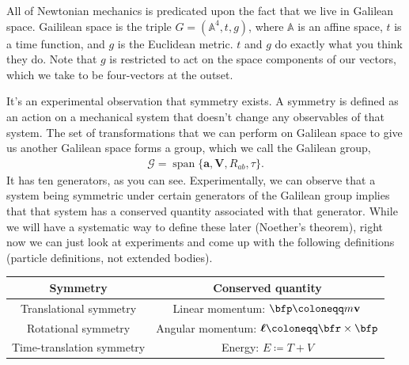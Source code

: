 \documentclass[11pt]{article}
\begin{document}



All of Newtonian mechanics is predicated upon the fact that we live
in Galilean space. Gaililean space is the triple $G = (\mathbb{A}^4, t, g)$,
where $\mathbb{A}$ is an affine space, $t$ is a time function, and $g$
is the Euclidean metric. $t$ and $g$ do exactly what you think they do.
Note that $g$ is restricted to act on the space components of our vectors,
which we take to be four-vectors at the outset.

It's an experimental observation that symmetry exists. A symmetry
is defined as an action on a mechanical system that doesn't change
any observables of that system. The set of transformations that
we can perform on Galilean space to give us another Galilean space
forms a group, which we call the Galilean group,
\begin{align*}
    \mathcal{G} = \operatorname{span}\{ \mathbf{a}, \mathbf{V}, R_{ab}, \tau \}.
\end{align*}
It has ten generators, as you can see. Experimentally, we can observe
that a system being symmetric under certain generators of the Galilean
group implies that that system has a conserved quantity associated with
that generator. While we will have a systematic way to define these later
(Noether's theorem), right now we can just look at experiments and come up
with the following definitions (particle definitions, not extended bodies).

\begin{table}[H]
    \centering
    \begin{tabular}{|c|c|}
        \hline
        Symmetry & Conserved quantity\\
        \hline
        Translational symmetry & Linear momentum: $\bfp \coloneqq m \mathbf{v}$\\
        Rotational symmetry & Angular momentum: $\boldsymbol{\ell} \coloneqq \bfr \times \bfp$\\
        Time-translation symmetry & Energy: $E \coloneqq T + V$\\
        \hline
    \end{tabular}
\end{table}
\end{document}

